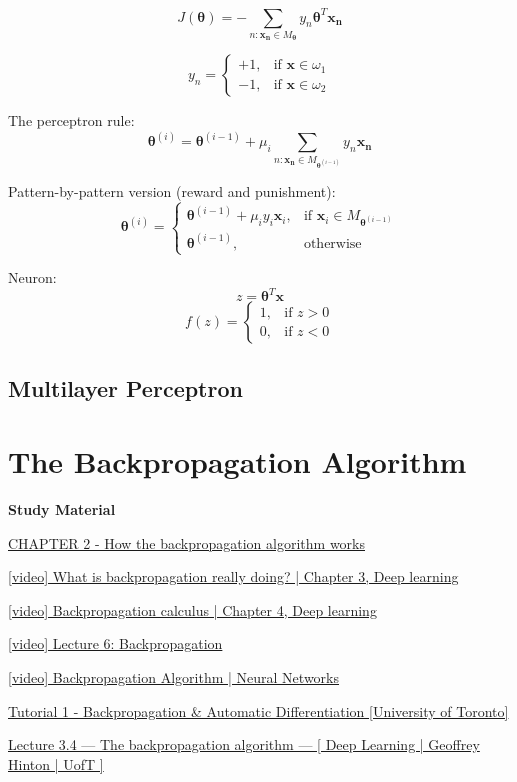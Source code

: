 \documentclass{report}
\begin{document}
\[J(\symbf{\theta}) = - \sum_{n: \symbf{x_n} \in M_{\symbf{\theta}}} y_n \symbf{\theta}^T \symbf{x_n}\]

\[y_n = \begin{cases}
	+1, & \text{if } \symbf{x} \in \omega_1 \\
	-1, & \text{if } \symbf{x} \in \omega_2
\end{cases}\]

The perceptron rule:
\[\symbf{\theta}^{(i)} = \symbf{\theta}^{(i-1)} + \mu_i \sum_{n: \symbf{x_n} \in M_{\symbf{\theta}^{(i-1)}}} y_n \symbf{x_n}\]

Pattern-by-pattern version (reward and punishment):
\[\symbf{\theta}^{(i)} = \begin{cases}
	\symbf{\theta}^{(i-1)} + \mu_i y_i \symbf{x}_i, &\text{if } \symbf{x}_i \in M_{\symbf{\theta}^{(i-1)}} \\
	\symbf{\theta}^{(i-1)}, &\text{otherwise}
\end{cases}\]

Neuron:
\[z = \symbf{\theta}^T \symbf{x}\]
\[f(z) = \begin{cases}
	1, & \text{if } z > 0 \\
	0, & \text{if } z < 0
\end{cases}\]

\subsection*{Multilayer Perceptron}

\section*{The Backpropagation Algorithm}

\begin{mdframed}
	\textbf{Study Material}

	\href{http://neuralnetworksanddeeplearning.com/chap2.html}{CHAPTER 2 - How the backpropagation algorithm works}

	\href{https://www.youtube.com/watch?v=Ilg3gGewQ5U&list=PLZHQObOWTQDNU6R1\_67000Dx\_ZCJB-3pi&index=3}{[video] What is backpropagation really doing? | Chapter 3, Deep learning}

	\href{https://www.youtube.com/watch?v=tIeHLnjs5U8&list=PLZHQObOWTQDNU6R1\_67000Dx\_ZCJB-3pi&index=4}{[video] Backpropagation calculus | Chapter 4, Deep learning}

	\href{https://www.youtube.com/watch?v=dB-u77Y5a6A}{[video] Lecture 6: Backpropagation}

	\href{https://www.youtube.com/watch?v=sIX\_9n-1UbM}{[video] Backpropagation Algorithm | Neural Networks}

	\href{https://www.cs.toronto.edu/~rgrosse/courses/csc2541\_2022/tutorials/tut01.pdf}{Tutorial 1 - Backpropagation \& Automatic Differentiation [University of Toronto]}

	\href{https://www.youtube.com/watch?v=VCT1N0EsGj0&list=PLLssT5z\_DsK\_gyrQ\_biidwvPYCRNGI3iv&index=14}{Lecture 3.4 — The backpropagation algorithm — [ Deep Learning | Geoffrey Hinton | UofT ]}
\end{mdframed}
\end{document}
